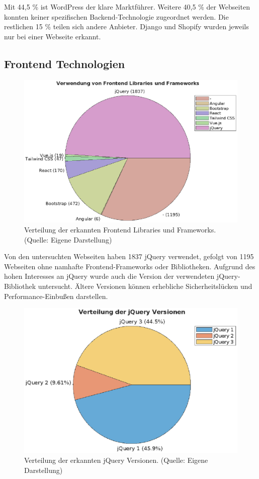 \documentclass[Bachelor,BIF,german,IEEE]{BASE/twbook}
\begin{document}
\noindent Mit 44,5 \% ist WordPress der klare Marktführer. Weitere 40,5 \% der Webseiten konnten keiner spezifischen Backend-Technologie zugeordnet werden. Die restlichen 15 \% teilen sich andere Anbieter. Django und Shopify wurden jeweils nur bei einer Webseite erkannt.

\clearpage 

\subsection{Frontend Technologien}
\begin{figure}[htp]
\centering
\includegraphics[width=1.0\linewidth]{matlab/pieLibraries.eps}
\caption{Verteilung der erkannten Frontend Libraries und Frameworks. (Quelle: Eigene Darstellung)}
\label{Abb2}
\end{figure}

\noindent Von den untersuchten Webseiten haben 1837 jQuery verwendet, gefolgt von 1195 Webseiten ohne namhafte Frontend-Frameworks oder Bibliotheken. Aufgrund des hohen Interesses an jQuery wurde auch die Version der verwendeten jQuery-Bibliothek untersucht. Ältere Versionen können erhebliche Sicherheitslücken und Performance-Einbußen darstellen.

\begin{figure}[hbp]
\centering
\includegraphics[width=1.0\linewidth]{matlab/pieJQuery.eps}
\caption{Verteilung der erkannten jQuery Versionen. (Quelle: Eigene Darstellung)}
\label{Abb3}
\end{figure}
\end{document}
